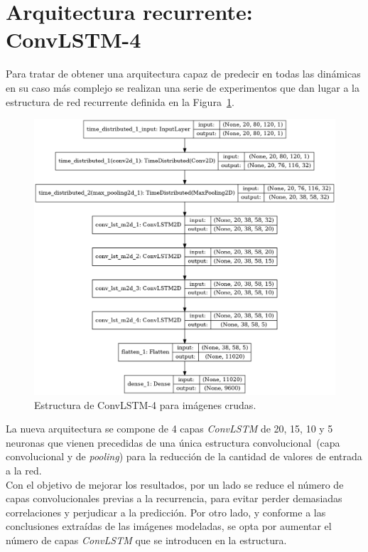 \section{Arquitectura recurrente: ConvLSTM-4}
Para tratar de obtener una arquitectura capaz de predecir en todas las dinámicas en su caso más complejo se realizan una serie de experimentos que dan lugar a la estructura de red recurrente definida en la Figura~\ref{fig.convLSTM4}.
\vspace{10pt}
\begin{figure}[H]
		\begin{center}
			\includegraphics[width=1\textwidth]{ figures/net/REC_convLSTM_complex.png}
			\caption{Estructura de ConvLSTM-4 para imágenes crudas.}
			\label{fig.convLSTM4}
		\end{center}
\end{figure}

La nueva arquitectura se compone de 4 capas \textit{ConvLSTM} de 20, 15, 10 y 5 neuronas que vienen precedidas de una única estructura convolucional~(capa convolucional y de \textit{pooling}) para la reducción de la cantidad de valores de entrada a la red.\\

Con el objetivo de mejorar los resultados, por un lado se reduce el número de capas convolucionales previas a la recurrencia, para evitar perder demasiadas correlaciones y perjudicar a la predicción. Por otro lado, y conforme a las conclusiones extraídas de las imágenes modeladas, se opta por aumentar el número de capas \textit{ConvLSTM} que se introducen en la estructura.

